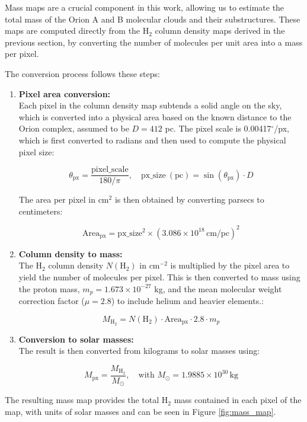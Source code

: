 Mass maps are a crucial component in this work, allowing us to estimate the total mass of the Orion A and B molecular clouds and their substructures. These maps are computed directly from the H$_2$ column density maps derived in the previous section, by converting the number of molecules per unit area into a mass per pixel.

The conversion process follows these steps:

\begin{enumerate}
    \item \textbf{Pixel area conversion:} \\
    Each pixel in the column density map subtends a solid angle on the sky, which is converted into a physical area based on the known distance to the Orion complex, assumed to be $D = 412$ pc. The pixel scale is 0.00417$^\circ$/px, which is first converted to radians and then used to compute the physical pixel size:

    \[
    \theta_{\mathrm{px}} = \frac{\mathrm{pixel\_scale}}{180/\pi}, \quad 
    \mathrm{px\_size\ (pc)} = \sin(\theta_{\mathrm{px}}) \cdot D
    \]

    The area per pixel in cm$^2$ is then obtained by converting parsecs to centimeters:

    \[
    \mathrm{Area_{px}} = \mathrm{px\_size}^2 \times (3.086 \times 10^{18}\,\mathrm{cm/pc})^2
    \]

    \item \textbf{Column density to mass:} \\
    The H$_2$ column density $N(\mathrm{H}_2)$ in cm$^{-2}$ is multiplied by the pixel area to yield the number of molecules per pixel. This is then converted to mass using the proton mass, $m_p = 1.673 \times 10^{-27}$ kg, and the mean molecular weight correction factor ($\mu = 2.8$) to include helium and heavier elements.:

    \[
    M_{\mathrm{H}_2} = N(\mathrm{H}_2) \cdot \mathrm{Area_{px}} \cdot 2.8 \cdot m_p
    \]

    \item \textbf{Conversion to solar masses:} \\
    The result is then converted from kilograms to solar masses using:

    \[
    M_{\mathrm{px}} = \frac{M_{\mathrm{H}_2}}{M_\odot}, \quad \text{with } M_\odot = 1.9885 \times 10^{30}\, \mathrm{kg}
    \]
\end{enumerate}

The resulting mass map provides the total H$_2$ mass contained in each pixel of the map, with units of solar masses and can be seen in Figure \ref{fig:mass_map}.

